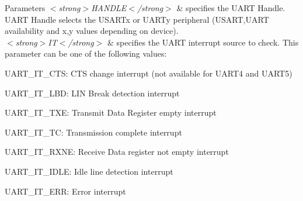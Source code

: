 \begin{DoxyParams}{Parameters}
{\em $<$strong$>$\-H\-A\-N\-D\-L\-E$<$/strong$>$} & specifies the U\-A\-R\-T Handle. U\-A\-R\-T Handle selects the U\-S\-A\-R\-Tx or U\-A\-R\-Ty peripheral (U\-S\-A\-R\-T,U\-A\-R\-T availability and x,y values depending on device). \\
\hline
{\em $<$strong$>$\-I\-T$<$/strong$>$} & specifies the U\-A\-R\-T interrupt source to check. This parameter can be one of the following values\-: \begin{DoxyItemize}
\item U\-A\-R\-T\-\_\-\-I\-T\-\_\-\-C\-T\-S\-: C\-T\-S change interrupt (not available for U\-A\-R\-T4 and U\-A\-R\-T5) \item U\-A\-R\-T\-\_\-\-I\-T\-\_\-\-L\-B\-D\-: L\-I\-N Break detection interrupt \item U\-A\-R\-T\-\_\-\-I\-T\-\_\-\-T\-X\-E\-: Transmit Data Register empty interrupt \item U\-A\-R\-T\-\_\-\-I\-T\-\_\-\-T\-C\-: Transmission complete interrupt \item U\-A\-R\-T\-\_\-\-I\-T\-\_\-\-R\-X\-N\-E\-: Receive Data register not empty interrupt \item U\-A\-R\-T\-\_\-\-I\-T\-\_\-\-I\-D\-L\-E\-: Idle line detection interrupt \item U\-A\-R\-T\-\_\-\-I\-T\-\_\-\-E\-R\-R\-: Error interrupt \end{DoxyItemize}
\\
\hline
\end{DoxyParams}

